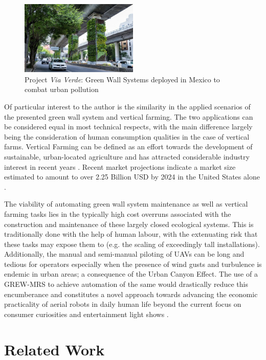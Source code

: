 \documentclass{report}
\begin{document}
\begin{figure}[h]
	\centering
	\includegraphics[width=0.5\textwidth]{images/MexicoColumns.jpg}
	\caption{Project \textit{Via Verde}: Green Wall Systems deployed in Mexico to combat urban pollution \cite{Rathi2017}}
	\label{fig:mexico_columns}
\end{figure}

Of particular interest to the author is the similarity in the applied scenarios of the presented green wall system and vertical farming. The two applications can be considered equal in most technical respects, with the main difference largely being the consideration of human consumption qualities in the case of vertical farms. Vertical Farming can be defined as an effort towards the development of sustainable, urban-located agriculture and has attracted considerable industry interest in recent years \cite{Banerjee2014}. Recent market projections indicate a market size estimated to amount to over 2.25 Billion USD by 2024 in the United States alone \cite{Gmi2017}.

The viability of automating green wall system maintenance as well as vertical farming tasks lies in the typically high cost overruns associated with the construction and maintenance of these largely closed ecological systems. This is traditionally done with the help of human labour, with the extenuating risk that these tasks may expose them to (e.g. the scaling of exceedingly tall installations). Additionally, the manual and semi-manual piloting of UAVs can be long and tedious for operators especially when the presence of wind gusts and turbulence is endemic in urban areas; a consequence of the Urban Canyon Effect. The use of a GREW-MRS to achieve automation of the same would drastically reduce this encumberance and constitutes a novel approach towards advancing the economic practicality \cite{Bircher2015} of aerial robots in daily human life beyond the current focus on consumer curiosities and entertainment light shows \cite{IQ2016}.

\section{Related Work}
\end{document}
